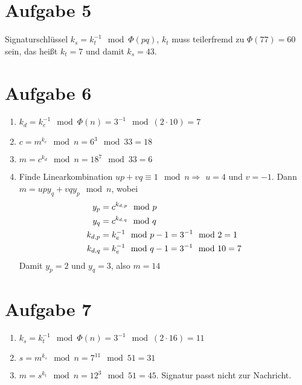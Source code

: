 \documentclass{article}
\begin{document}
	\section*{Aufgabe 5}
	Signaturschlüssel $k_s = k_t^{-1}\mod \Phi(pq)$, $k_t$ muss teilerfremd zu $\Phi(77) = 60$ sein, das heißt $k_t = 7$ und damit $k_s = 43$.
	
	\section*{Aufgabe 6}
	\begin{enumerate}[label=(\alph*)]
		\item $k_d = k_e^{-1}\mod \Phi(n) = 3^{-1}\mod (2\cdot 10) = 7$
		\item $c = m^{k_e}\mod n = 6^3\mod 33 = 18$
		\item $m = c^{k_d}\mod n = 18^7\mod 33 = 6$
		\item Finde Linearkombination $up + vq \equiv 1 \mod n \Rightarrow$ $u = 4$ und $v = -1$. Dann $m = upy_q + vqy_p \mod n$, wobei
		\begin{align}
			y_p &= c^{k_{d,p}} \mod p \notag \\
			y_q &= c^{k_{d,q}} \mod q \notag \\
			k_{d,p} &= k_e^{-1} \mod p-1 = 3^{-1} \mod 2 = 1 \notag \\
			k_{d,q} &= k_e^{-1} \mod q-1  = 3^{-1} \mod 10 = 7 \notag
		\end{align}
		Damit $y_p = 2$ und $y_q = 3$, also $m = 14$
	\end{enumerate}
	
	\section*{Aufgabe 7}
	\begin{enumerate}[label=(\alph*)]
		\item $k_s = k_t^{-1}\mod \Phi(n) = 3^{-1}\mod (2\cdot 16) = 11$
		\item $s = m^{k_s}\mod n = 7^{11}\mod 51 = 31$
		\item $m = s^{k_t}\mod n = 12^3\mod 51 = 45$. Signatur passt nicht zur Nachricht.
	\end{enumerate}
\end{document}
